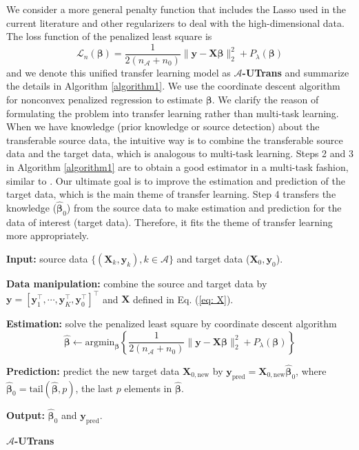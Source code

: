 \documentclass[twoside,12pt]{article}
\newcommand{\mb}[1]{\boldsymbol{\mathbf{#1}}}
\newcommand{\wh}[1]{\widehat{#1}}
\begin{document}
We consider a more general penalty function that includes the Lasso used in the current literature and other regularizers to deal with the high-dimensional data.
	The loss function of the penalized least square is
	\begin{equation}
		\label{eq: loss}
	\mathcal{L}_n(\mb\beta)=\frac{1}{2\left(n_{\mathcal{A}}+n_{0}\right)}\|\mathbf{y}-\mathbf{X} \boldsymbol{\beta}\|_2^{2}+P_{\lambda}(\mb\beta)
	\end{equation}
    and we denote this unified transfer learning model as \textbf{$\mathcal A$-UTrans} and summarize the details in Algorithm \ref{algorithm1}.
    We use the coordinate descent algorithm for nonconvex penalized regression \citep{breheny2011coordinate} to estimate $\mb\beta$.
    We clarify the reason of formulating the problem into transfer learning rather than multi-task learning.
    When we have knowledge (prior knowledge or source detection) about the transferable source data, the intuitive way is to combine the transferable source data and the target data, which is analogous to multi-task learning.
    Steps 2 and 3 in Algorithm \ref{algorithm1} are to obtain a good estimator in a multi-task fashion, similar to \cite{tian2022transfer}.
    Our ultimate goal is to improve the estimation and prediction of the target data, which is the main theme of transfer learning.
    Step 4 transfers the knowledge ($\wh{\mb\beta}_0$) from the source data to make estimation and prediction for the data of interest (target data).
    Therefore, it fits the theme of transfer learning more appropriately.
    
    \begin{algorithm}[hbt!]
    	\textbf{Input:} {source data $\{(\mb X_k, \mb y_k), k\in\mathcal A\}$ and target data ($\mb X_0, \mb y_0$)}.
    	
    	\vspace{1mm}
    	
    	\textbf{Data manipulation:} combine the source and target data by $\mb y=[\mb y_1^\top,\cdots, \mb y_K^\top, \mb y_0^\top]^\top$ and $\mb X$ defined in Eq. (\ref{eq: X}).
    	
    	\vspace{1mm}
    	
    	\textbf{Estimation:} solve the penalized least square by coordinate descent algorithm
    	$$\wh{\mb\beta}\leftarrow\text{argmin}_{\mb\beta}\left\{\frac{1}{2\left(n_{\mathcal{A}}+n_{0}\right)}\|\mathbf{y}-\mathbf{X} \boldsymbol{\beta}\|_2^{2}+P_{\lambda}(\mb\beta)\right\}$$
    	
    	\vspace{1mm}

     \textbf{Prediction:} predict the new target data $\mb X_{0, \text{new}}$ by $\mb y_{\text{pred}}=\mb X_{0, \text{new}}\wh{\mb\beta}_0$, where $\wh{\mb\beta}_0=\text{tail}(\wh{\mb\beta}, p)$, the last $p$ elements in $\wh{\mb\beta}$.

     \vspace{1mm}
    	
    	\textbf{Output:} $\wh{\mb\beta}_0$ and $\mb y_{\text{pred}}$.
    	
    	\caption{\textbf{$\mathcal A$-UTrans}}
    	\label{algorithm1}
    \end{algorithm}
\end{document}

